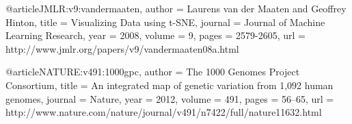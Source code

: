 @article{JMLR:v9:vandermaaten,
	author    = {Laurens van der Maaten and Geoffrey Hinton},
	title     = {Visualizing Data using t-SNE},
	journal   = {Journal of Machine Learning Research},
	year      = {2008},
	volume    = {9},
	pages     = {2579-2605},
	url       = {http://www.jmlr.org/papers/v9/vandermaaten08a.html}
}

@article{NATURE:v491:1000gpc,
	author    = {The 1000 Genomes Project Consortium},
	title     = {An integrated map of genetic variation from 1,092 human genomes},
	journal   = {Nature},
	year      = {2012},
	volume    = {491},
	pages     = {56–65},
	url       = {http://www.nature.com/nature/journal/v491/n7422/full/nature11632.html}
}
